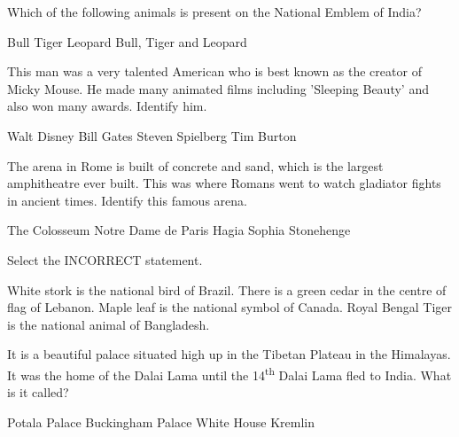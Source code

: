 \begin{questions}
    \question Which of the following animals is present on the National Emblem of India?

    \begin{randomizeoneparchoices}
        \CorrectChoice Bull
        \choice Tiger
        \choice Leopard
        \choice Bull, Tiger and Leopard
    \end{randomizeoneparchoices}

    \question This man was a very talented American who is best known as the creator of Micky Mouse. He made many animated films including 'Sleeping Beauty' and also won many awards. Identify him.

    \begin{randomizeoneparchoices}
        \CorrectChoice Walt Disney
        \choice Bill Gates
        \choice Steven Spielberg
        \choice Tim Burton
    \end{randomizeoneparchoices}

    \question The arena in Rome is built of concrete and sand, which is the largest amphitheatre ever built. This was where Romans went to watch gladiator fights in ancient times. Identify this famous arena.

    \begin{randomizeoneparchoices}
        \CorrectChoice The Colosseum
        \choice Notre Dame de Paris
        \choice Hagia Sophia
        \choice Stonehenge
    \end{randomizeoneparchoices}

    \question Select the INCORRECT statement.

    \begin{randomizechoices}
        \CorrectChoice White stork is the national bird of Brazil.
        \choice There is a green cedar in the centre of flag of Lebanon.
        \choice Maple leaf is the national symbol of Canada.
        \choice Royal Bengal Tiger is the national animal of Bangladesh.
    \end{randomizechoices}

    \question It is a beautiful palace situated high up in the Tibetan Plateau in the Himalayas. It was the home of the Dalai Lama until the 14\textsuperscript{th} Dalai Lama fled to India. What is it called?

    \begin{randomizeoneparchoices}
        \CorrectChoice Potala Palace
        \choice Buckingham Palace
        \choice White House
        \choice Kremlin
    \end{randomizeoneparchoices}


\end{questions}
